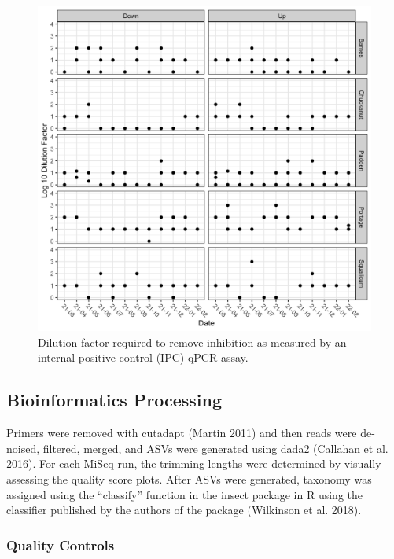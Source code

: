 \documentclass[
]{article}
\begin{document}
\begin{figure}
\centering
\includegraphics{../Output/SupplementalFigures/inhibition_dilution_factors.png}
\caption{Dilution factor required to remove inhibition as measured by an
internal positive control (IPC) qPCR assay.}
\end{figure}

\hypertarget{bioinformatics-processing}{%
\subsection{Bioinformatics Processing}\label{bioinformatics-processing}}

Primers were removed with cutadapt (Martin 2011) and then reads were
de-noised, filtered, merged, and ASVs were generated using dada2
(Callahan et al. 2016). For each MiSeq run, the trimming lengths were
determined by visually assessing the quality score plots. After ASVs
were generated, taxonomy was assigned using the ``classify'' function in
the insect package in R using the classifier published by the authors of
the package (Wilkinson et al. 2018).

\hypertarget{quality-controls}{%
\subsubsection{Quality Controls}\label{quality-controls}}
\end{document}
